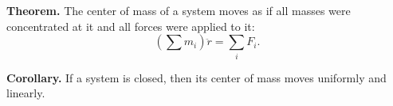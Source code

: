 \textbf{Theorem.} The center of mass of a system moves as if all masses were concentrated at it and all forces were applied to it:
$$\left(\sum m_i\right) \ddot{r} = \sum_i F_i.$$

\textbf{Corollary.} If a system is closed, then its center of mass moves uniformly and linearly.
